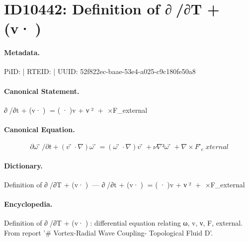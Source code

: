\section*{ID10442: Definition of ∂ω⃗/∂T + (v⃗·∇)ω⃗}
\paragraph{Metadata.}
PiID:  | RTEID:  | UUID: 52f822ec-baae-53e4-a025-c9c180fe50a8

\paragraph{Canonical Statement.}
∂ω⃗/∂t + (v⃗·∇)ω⃗ = (ω⃗·∇)v⃗ + ν∇²ω⃗ + ∇×F⃗\_external

\paragraph{Canonical Equation.}
\[
∂ω⃗/∂t + (v⃗·∇)ω⃗ = (ω⃗·∇)v⃗ + ν∇²ω⃗ + ∇×F⃗_external
\]

\paragraph{Dictionary.}
Definition of ∂ω⃗/∂T + (v⃗·∇)ω⃗ — ∂ω⃗/∂t + (v⃗·∇)ω⃗ = (ω⃗·∇)v⃗ + ν∇²ω⃗ + ∇×F⃗\_external

\paragraph{Encyclopedia.}
Definition of ∂ω⃗/∂T + (v⃗·∇)ω⃗: differential equation relating ω, v, ν, F, external. From report '\# Vortex-Radial Wave Coupling- Topological Fluid D'.
